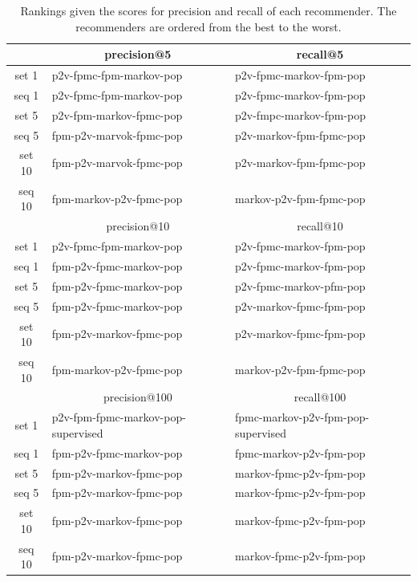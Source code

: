 \documentclass[prodmode,acmtecs]{acmsmall} %
\begin{document}
\begin{table}[ht]
	\centering
	\caption{Rankings given the scores for precision and recall of each recommender. The recommenders are ordered from the best to the worst.}
	\begin{tabular}{|c|l|l|}
		\toprule
		& \multicolumn{1}{c|}{precision@5} & \multicolumn{1}{c|}{recall@5} \\
		\bottomrule
		set  1 & p2v-fpmc-fpm-markov-pop & p2v-fpmc-markov-fpm-pop \\
		\midrule
		seq 1 & p2v-fpmc-fpm-markov-pop & p2v-fpmc-markov-fpm-pop \\
		\midrule
		\midrule
		set 5 & p2v-fpm-markov-fpmc-pop & p2v-fmpc-markov-fpm-pop \\
		\midrule
		seq 5 & fpm-p2v-marvok-fpmc-pop & p2v-markov-fpm-fpmc-pop \\
		\midrule
		\midrule
		set 10 & fpm-p2v-marvok-fpmc-pop & p2v-markov-fpm-fpmc-pop \\
		\midrule
		seq 10 & fpm-markov-p2v-fpmc-pop & markov-p2v-fpm-fpmc-pop \\
	\toprule
		\multicolumn{1}{r|}{} & \multicolumn{1}{c|}{precision@10} & \multicolumn{1}{c|}{recall@10} \\
			\bottomrule
		set  1 & p2v-fpmc-fpm-markov-pop & p2v-fpmc-markov-fpm-pop \\
		\midrule
		seq 1 & fpm-p2v-fpmc-markov-pop & p2v-fpmc-markov-fpm-pop \\
		\midrule
		\midrule
		set 5 & fpm-p2v-fpmc-markov-pop & p2v-fpmc-markov-pfm-pop \\
		\midrule
		seq 5 & fpm-p2v-fpmc-markov-pop & p2v-markov-fpmc-fpm-pop \\
		\midrule
		\midrule
		set 10 & fpm-p2v-markov-fpmc-pop & p2v-markov-fpmc-fpm-pop \\
		\midrule
		seq 10 & fpm-markov-p2v-fpmc-pop & markov-p2v-fpm-fpmc-pop \\
		\toprule
		\multicolumn{1}{r|}{} & \multicolumn{1}{c|}{precision@100} & \multicolumn{1}{c|}{recall@100} \\
		\bottomrule
		set  1 & p2v-fpm-fpmc-markov-pop-supervised & fpmc-markov-p2v-fpm-pop-supervised \\
		\midrule
		seq 1 & fpm-p2v-fpmc-markov-pop & fpmc-markov-p2v-fpm-pop \\
		\midrule
		\midrule
		set 5 & fpm-p2v-markov-fpmc-pop & markov-fpmc-p2v-fpm-pop \\
		\midrule
		seq 5 & fpm-p2v-markov-fpmc-pop & markov-fpmc-p2v-fpm-pop \\
		\midrule
		\midrule
		set 10 & fpm-p2v-markov-fpmc-pop & markov-fpmc-p2v-fpm-pop \\
		\midrule
		seq 10 & fpm-p2v-markov-fpmc-pop & markov-fpmc-p2v-fpm-pop \\
		\bottomrule
	\end{tabular}%
	\label{tab:rankings}%
\end{table}%
\end{document}
